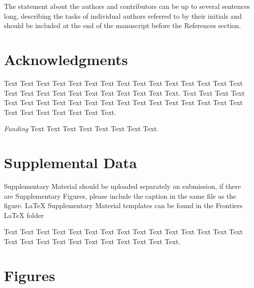 \documentclass{frontiersSCNS} %
\begin{document}
The statement about the authors and contributors can be up to several sentences long, describing the tasks of individual authors referred to by their initials and should be included at the end of the manuscript before the References section.


\section*{Acknowledgments}
Text Text Text Text Text Text  Text Text Text Text Text Text Text Text  Text Text Text Text Text Text Text Text Text  Text Text Text. Text Text Text Text Text Text  Text Text Text Text Text Text Text Text  Text Text Text Text Text Text Text Text Text  Text Text Text. 


\textit{Funding\textcolon} Text Text Text Text Text Text  Text Text.

\section*{Supplemental Data}
Supplementary Material should be uploaded separately on submission, if there are Supplementary Figures, please include the caption in the same file as the figure. LaTeX Supplementary Material templates can be found in the Frontiers LaTeX folder

Text Text Text Text Text Text  Text Text Text Text Text Text Text Text  Text Text Text Text Text Text Text Text Text  Text Text Text.





\section*{Figures}

\end{document}
